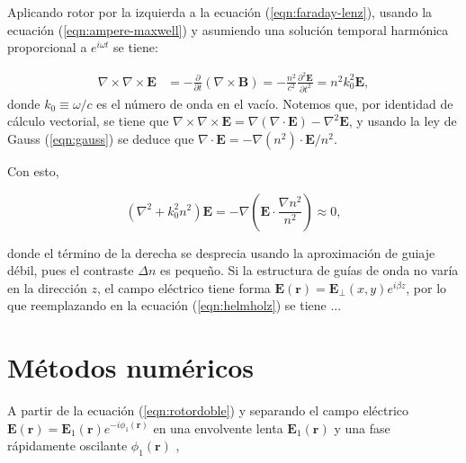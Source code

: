 \documentclass{article}
\begin{document}
Aplicando rotor por la izquierda a la ecuación (\ref{eqn:faraday-lenz}), usando la ecuación (\ref{eqn:ampere-maxwell}) y asumiendo una solución temporal harmónica proporcional a $e^{i\omega t}$ se tiene:

\begin{align}
	\nabla\times\nabla\times\textbf{E} &= -\frac{\partial}{\partial t}(\nabla\times\textbf{B}) = -\frac{n^2}{c^2}\frac{\partial^2 \textbf{E}}{\partial t^2} = n^2k_0^2 \textbf{E}, \label{eqn:rotordoble}
\end{align}
donde $k_0 \equiv \omega/c$ es el número de onda en el vacío. Notemos que, por identidad de cálculo vectorial, se tiene que $\nabla\times\nabla\times\textbf{E} = \nabla(\nabla\cdot\textbf{E}) - \nabla^2\textbf{E}$, y usando la ley de Gauss (\ref{eqn:gauss}) se deduce que $\nabla\cdot \textbf{E} = -\nabla(n^2)\cdot\textbf{E}/n^2$.

Con esto, 

\begin{equation}
	(\nabla^2  + k_0^2n^2)\textbf{E} = -\nabla\left(\textbf{E} \cdot \frac{\nabla n^2}{n^2}\right) \approx 0, \label{eqn:helmholz}
\end{equation}

donde el término de la derecha se desprecia usando la aproximación de guiaje débil, pues el contraste $\Delta n$ es pequeño. Si la estructura de guías de onda no varía en la dirección $z$, el campo eléctrico tiene forma $\textbf{E}(\textbf{r}) = \textbf{E}_\perp(x,y) e^{i\beta z}$, por lo que reemplazando en la ecuación (\ref{eqn:helmholz}) se tiene ...


\section{Métodos numéricos}

A partir de la ecuación (\ref{eqn:rotordoble}) y separando el campo eléctrico $\textbf{E}(\textbf{r}) = \textbf{E}_1(\textbf{r}) e^{-i \phi_1 (\textbf{r})}$ en una envolvente lenta $\textbf{E}_1(\textbf{r})$ y una fase rápidamente oscilante $\phi_1 (\textbf{r})$ ,
\end{document}
